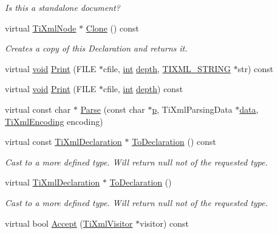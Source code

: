 \begin{DoxyCompactItemize}
\begin{DoxyCompactList}\small\item\em Is this a standalone document? \end{DoxyCompactList}\item 
virtual \hyperlink{class_ti_xml_node}{Ti\-Xml\-Node} $\ast$ \hyperlink{class_ti_xml_declaration_a7cf459186040141cda7a180a6585ce2e}{Clone} () const 
\begin{DoxyCompactList}\small\item\em Creates a copy of this Declaration and returns it. \end{DoxyCompactList}\item 
virtual \hyperlink{wglew_8h_aeea6e3dfae3acf232096f57d2d57f084}{void} \hyperlink{class_ti_xml_declaration_a347cd8e2b0b5c65058c9f59a106e3d4c}{Print} (F\-I\-L\-E $\ast$cfile, \hyperlink{wglew_8h_a500a82aecba06f4550f6849b8099ca21}{int} \hyperlink{glew_8h_a1c814629538debe12a7bfe2509a3671e}{depth}, \hyperlink{tinyxml_8h_a92bada05fd84d9a0c9a5bbe53de26887}{T\-I\-X\-M\-L\-\_\-\-S\-T\-R\-I\-N\-G} $\ast$str) const 
\item 
virtual \hyperlink{wglew_8h_aeea6e3dfae3acf232096f57d2d57f084}{void} \hyperlink{class_ti_xml_declaration_abf6303db4bd05b5be554036817ff1cb4}{Print} (F\-I\-L\-E $\ast$cfile, \hyperlink{wglew_8h_a500a82aecba06f4550f6849b8099ca21}{int} \hyperlink{glew_8h_a1c814629538debe12a7bfe2509a3671e}{depth}) const 
\item 
virtual const char $\ast$ \hyperlink{class_ti_xml_declaration_a12dbb498d45f74fe58cd05dde608a39d}{Parse} (const char $\ast$\hyperlink{glew_8h_aa5367c14d90f462230c2611b81b41d23}{p}, Ti\-Xml\-Parsing\-Data $\ast$\hyperlink{fmod__codec_8h_a42c2b1d86fa71a425e73a882cb0a72c8}{data}, \hyperlink{tinyxml_8h_a88d51847a13ee0f4b4d320d03d2c4d96}{Ti\-Xml\-Encoding} encoding)
\item 
virtual const \hyperlink{class_ti_xml_declaration}{Ti\-Xml\-Declaration} $\ast$ \hyperlink{class_ti_xml_declaration_a1e085d3fefd1dbf5ccdbff729931a967}{To\-Declaration} () const 
\begin{DoxyCompactList}\small\item\em Cast to a more defined type. Will return null not of the requested type. \end{DoxyCompactList}\item 
virtual \hyperlink{class_ti_xml_declaration}{Ti\-Xml\-Declaration} $\ast$ \hyperlink{class_ti_xml_declaration_a6bd3d1daddcaeb9543c24bfd090969ce}{To\-Declaration} ()
\begin{DoxyCompactList}\small\item\em Cast to a more defined type. Will return null not of the requested type. \end{DoxyCompactList}\item 
virtual bool \hyperlink{class_ti_xml_declaration_a22315a535983b86535cdba3458669e3e}{Accept} (\hyperlink{class_ti_xml_visitor}{Ti\-Xml\-Visitor} $\ast$visitor) const 
\end{DoxyCompactItemize}
